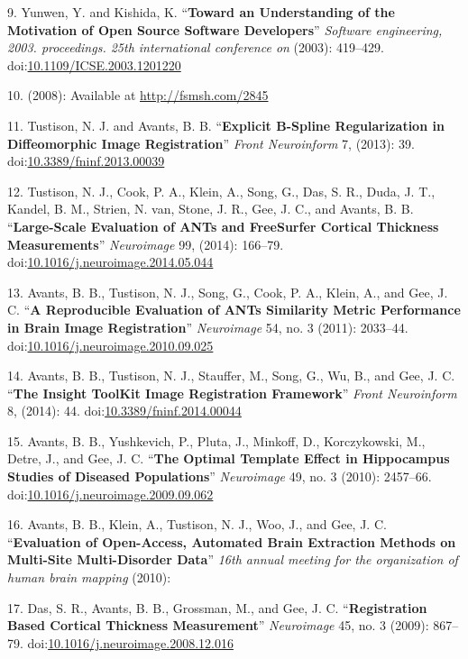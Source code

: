 \documentclass[11pt,]{article}
\begin{document}
9. Yunwen, Y. and Kishida, K. ``\textbf{Toward an Understanding of the
Motivation of Open Source Software Developers}'' \emph{Software
engineering, 2003. proceedings. 25th international conference on}
(2003): 419--429.
doi:\href{http://dx.doi.org/10.1109/ICSE.2003.1201220}{10.1109/ICSE.2003.1201220}

10. (2008): Available at \url{http://fsmsh.com/2845}

11. Tustison, N. J. and Avants, B. B. ``\textbf{Explicit B-Spline
Regularization in Diffeomorphic Image Registration}'' \emph{Front
Neuroinform} 7, (2013): 39.
doi:\href{http://dx.doi.org/10.3389/fninf.2013.00039}{10.3389/fninf.2013.00039}

12. Tustison, N. J., Cook, P. A., Klein, A., Song, G., Das, S. R., Duda,
J. T., Kandel, B. M., Strien, N. van, Stone, J. R., Gee, J. C., and
Avants, B. B. ``\textbf{Large-Scale Evaluation of ANTs and FreeSurfer
Cortical Thickness Measurements}'' \emph{Neuroimage} 99, (2014):
166--79.
doi:\href{http://dx.doi.org/10.1016/j.neuroimage.2014.05.044}{10.1016/j.neuroimage.2014.05.044}

13. Avants, B. B., Tustison, N. J., Song, G., Cook, P. A., Klein, A.,
and Gee, J. C. ``\textbf{A Reproducible Evaluation of ANTs Similarity
Metric Performance in Brain Image Registration}'' \emph{Neuroimage} 54,
no. 3 (2011): 2033--44.
doi:\href{http://dx.doi.org/10.1016/j.neuroimage.2010.09.025}{10.1016/j.neuroimage.2010.09.025}

14. Avants, B. B., Tustison, N. J., Stauffer, M., Song, G., Wu, B., and
Gee, J. C. ``\textbf{The Insight ToolKit Image Registration Framework}''
\emph{Front Neuroinform} 8, (2014): 44.
doi:\href{http://dx.doi.org/10.3389/fninf.2014.00044}{10.3389/fninf.2014.00044}

15. Avants, B. B., Yushkevich, P., Pluta, J., Minkoff, D., Korczykowski,
M., Detre, J., and Gee, J. C. ``\textbf{The Optimal Template Effect in
Hippocampus Studies of Diseased Populations}'' \emph{Neuroimage} 49, no.
3 (2010): 2457--66.
doi:\href{http://dx.doi.org/10.1016/j.neuroimage.2009.09.062}{10.1016/j.neuroimage.2009.09.062}

16. Avants, B. B., Klein, A., Tustison, N. J., Woo, J., and Gee, J. C.
``\textbf{Evaluation of Open-Access, Automated Brain Extraction Methods
on Multi-Site Multi-Disorder Data}'' \emph{16th annual meeting for the
organization of human brain mapping} (2010):

17. Das, S. R., Avants, B. B., Grossman, M., and Gee, J. C.
``\textbf{Registration Based Cortical Thickness Measurement}''
\emph{Neuroimage} 45, no. 3 (2009): 867--79.
doi:\href{http://dx.doi.org/10.1016/j.neuroimage.2008.12.016}{10.1016/j.neuroimage.2008.12.016}
\end{document}
